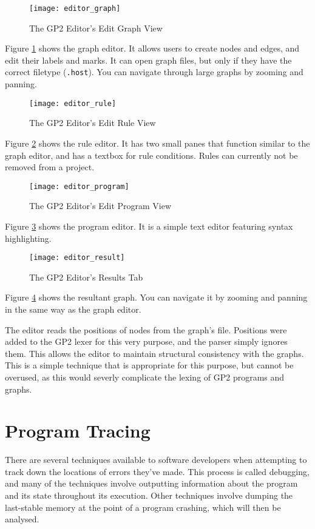\documentclass{UoYCSproject}
\begin{document}
\begin{figure}
\label{img:editor_graph}
\texttt{[image: editor\_graph]}
\caption{The GP2 Editor's Edit Graph View}
\end{figure}

Figure \ref{img:editor_graph} shows the graph editor. It allows users to create nodes and edges, and edit their labels and marks. It can open graph files, but only if they have the correct filetype (\texttt{.host}). You can navigate through large graphs by zooming and panning.

\begin{figure}
\label{img:editor_rule}
\texttt{[image: editor\_rule]}
\caption{The GP2 Editor's Edit Rule View}
\end{figure}

Figure \ref{img:editor_rule} shows the rule editor. It has two small panes that function similar to the graph editor, and has a textbox for rule conditions. Rules can currently not be removed from a project.

\begin{figure}
\label{img:editor_program}
\texttt{[image: editor\_program]}
\caption{The GP2 Editor's Edit Program View}
\end{figure}

Figure \ref{img:editor_program} shows the program editor. It is a simple text editor featuring syntax highlighting.

\begin{figure}
\label{img:editor_result}
\texttt{[image: editor\_result]}
\caption{The GP2 Editor's Results Tab}
\end{figure}

Figure \ref{img:editor_result} shows the resultant graph. You can navigate it by zooming and panning in the same way as the graph editor.

The editor reads the positions of nodes from the graph's file. Positions were added to the GP2 lexer for this very purpose, and the parser simply ignores them. This allows the editor to maintain structural consistency with the graphs. This is a simple technique that is appropriate for this purpose, but cannot be overused, as this would severly complicate the lexing of GP2 programs and graphs.

\section{Program Tracing}
There are several techniques available to software developers when attempting to track down the locations of errors they've made. This process is called debugging, and many of the techniques involve outputting information about the program and its state throughout its execution. Other techniques involve dumping the last-stable memory at the point of a program crashing, which will then be analysed. 
\end{document}
